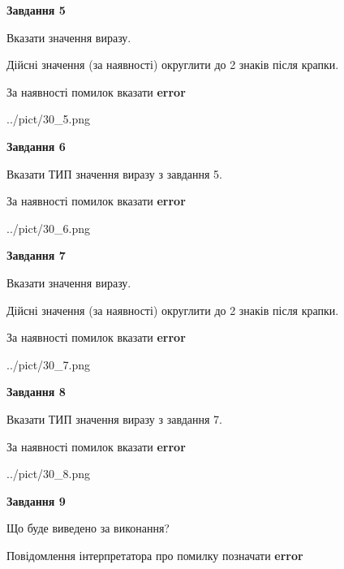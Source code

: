 \documentclass[11pt, ukrainian]{article}
\begin{document}
{\begin {large}
{\begin {center}\textbf{Завдання 5}\end {center}}\par
Вказати значення виразу. \par
Дійсні значення (за наявності) округлити до 2 знаків після крапки. \par
За наявності помилок вказати \textbf{error}

\begin{center}
	{../pict/30_5.png}
\end{center}
\newpage

{\begin {center}\textbf{Завдання 6}\end {center}}\par
Вказати ТИП значення виразу з завдання 5. \par
За наявності помилок вказати \textbf{error}

\begin{center}
	{../pict/30_6.png}
\end{center}
\newpage

{\begin {center}\textbf{Завдання 7}\end {center}}\par
Вказати значення виразу. \par
Дійсні значення (за наявності) округлити до 2 знаків після крапки. \par
За наявності помилок вказати \textbf{error}

\begin{center}
	{../pict/30_7.png}
\end{center}
\newpage

{\begin {center}\textbf{Завдання 8}\end {center}}\par
Вказати ТИП значення виразу з завдання 7. \par
За наявності помилок вказати \textbf{error}

\begin{center}
	{../pict/30_8.png}
\end{center}
\newpage

{\begin {center}\textbf{Завдання 9}\end {center}}\par
Що буде виведено за виконання? \par
Повідомлення інтерпретатора про помилку позначати \textbf{error}


\end{large}}
\end{document}

